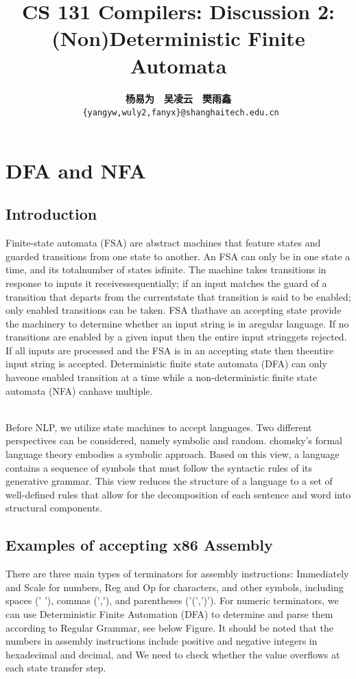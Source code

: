 \documentclass[a4paper]{exam}
\title{CS 131 Compilers: Discussion 2: (Non)Deterministic Finite Automata}
\author{\textbf{杨易为}~~\textbf{吴凌云}~~\textbf{樊雨鑫} \\ \texttt{ \{yangyw,wuly2,fanyx\}@shanghaitech.edu.cn}}
\begin{document}
\maketitle

\section{DFA and NFA}

\subsection{Introduction}



Finite-state automata (FSA) are abstract machines that feature states and guarded transitions from one state to another. An FSA can only be in one state a time, and its totalnumber of states isfinite.  The machine takes transitions in response to inputs it receivessequentially;  if an input matches the guard of a transition that departs from the currentstate that transition is said to be enabled; only enabled transitions can be taken.  FSA thathave an accepting state provide the machinery to determine whether an input string is in aregular language.  If no transitions are enabled by a given input then the entire input stringgets  rejected.   If  all  inputs  are  processed  and  the  FSA  is  in  an  accepting  state  then  theentire input string is accepted.  Deterministic finite state automata (DFA) can only haveone enabled transition at a time while a non-deterministic finite state automata (NFA) canhave multiple.

\\

Before NLP, we utilize state machines to accept languages. Two different perspectives can be considered, namely symbolic and random. chomsky's formal language theory embodies a symbolic approach. Based on this view, a language contains a sequence of symbols that must follow the syntactic rules of its generative grammar. This view reduces the structure of a language to a set of well-defined rules that allow for the decomposition of each sentence and word into structural components.

\subsection{Examples of accepting x86 Assembly\cite{bcst}}

There are three main types of terminators for assembly instructions: Immediately and Scale for numbers, Reg and Op for characters, and other symbols, including spaces (' '), commas (','), and parentheses ('(',')'). For numeric terminators, we can use Deterministic Finite Automation (DFA) to determine and parse them according to Regular Grammar, see below Figure. It should be noted that the numbers in assembly instructions include positive and negative integers in hexadecimal and decimal, and We need to check whether the value overflows at each state transfer step.
\end{document}
